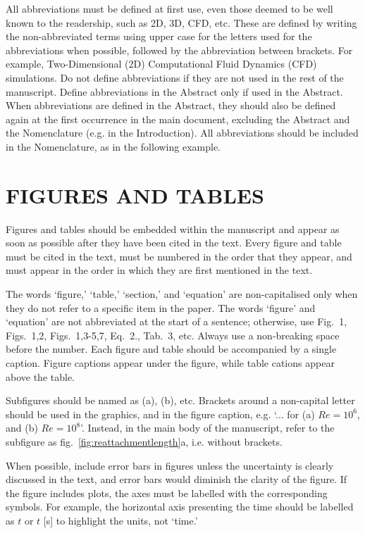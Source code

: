 \documentclass{article}
\begin{document}
All abbreviations must be defined at first use, even those deemed to be well known to the readership, such as 2D, 3D, CFD, etc. These are defined by writing the non-abbreviated terms using upper case for the letters used for the abbreviations when possible, followed by the abbreviation between brackets. For example, Two-Dimensional (2D) Computational Fluid Dynamics (CFD) simulations. 
Do not define abbreviations if they are not used in the rest of the manuscript. Define abbreviations in the Abstract only if used in the Abstract. When abbreviations are defined in the Abstract, they should also be defined again at the first occurrence in the main document, excluding the Abstract and the Nomenclature (e.g. in the Introduction). All abbreviations should be included in the Nomenclature, as in the following example. 


\section{FIGURES AND TABLES} \label{sec:figures}

Figures and tables should be embedded within the manuscript and appear as soon as possible after they have been cited in the text. Every figure and table must be cited in the text, must be numbered in the order that they appear, and must appear in the order in which they are first mentioned in the text. 

The words `figure,' `table,' `section,' and `equation' are non-capitalised only when they do not refer to a specific item in the paper. The words `figure' and `equation' are not abbreviated at the start of a sentence; otherwise, use Fig.~1, Figs.~1,2, Figs.~1,3-5,7, Eq.~2., Tab.~3, etc. Always use a non-breaking space before the number. Each figure and table should be accompanied by a single caption. Figure captions appear under the figure, while table cations appear above the table. 

Subfigures should be named as (a), (b), etc. Brackets around a non-capital letter should be used in the graphics, and in the figure caption, e.g. `... for (a) $Re=10^6$, and (b) $Re=10^8$'. Instead, in the main body of the manuscript, refer to the subfigure as fig.~\ref{fig:reattachmentlength}a, i.e. without brackets. 

When possible, include error bars in figures unless the uncertainty is clearly discussed in the text, and error bars would diminish the clarity of the figure. If the figure includes plots, the axes must be labelled with the corresponding symbols. For example, the horizontal axis presenting the time should be labelled as $t$ or $t$ [s] to highlight the units, not `time.' 
\end{document}

